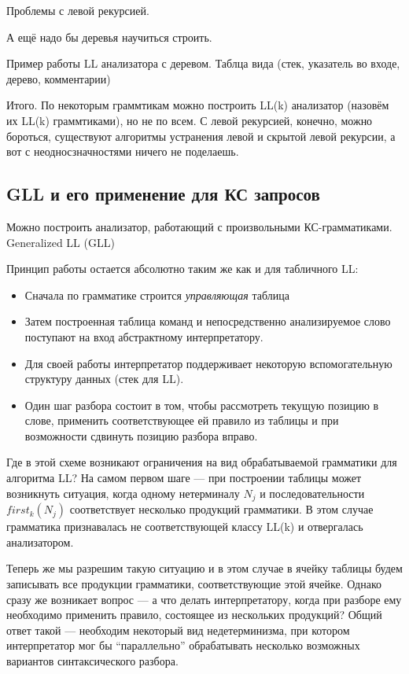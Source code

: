Проблемы с левой рекурсией.

А ещё надо бы деревья научиться строить.

\begin{example}Пример работы LL анализатора с деревом.
  Таблца вида (стек, указатель во входе, дерево, комментарии)
\end{example}

Итого. По некоторым граммтикам можно построить LL(k) анализатор (назовём их LL(k) граммтиками), но не по всем.
С левой рекурсией, конечно, можно бороться, существуют алгоритмы устранения левой и скрытой левой рекурсии, а вот с неодносзначностями ничего не поделаешь.



\subsection{GLL и его применение для КС запросов}

Можно построить анализатор, работающий с произвольными КС-грамматиками.
Generalized LL (GLL)~\cite{Scott:2010:GP:1860132.1860320,10.1007/978-3-662-46663-6_5}

Принцип работы остается абсолютно таким же как и для табличного LL: 
\begin{itemize}
  \item Сначала по грамматике строится \textit{управляющая} таблица
  \item Затем построенная таблица команд и непосредственно анализируемое слово поступают на вход абстрактному интерпретатору.
  \item Для своей работы интерпретатор поддерживает некоторую вспомогательную структуру данных (стек для LL).
  \item Один шаг разбора состоит в том, чтобы рассмотреть текущую позицию в слове, применить соответствующее ей правило из таблицы и при возможности сдвинуть позицию разбора вправо.
\end{itemize}

Где в этой схеме возникают ограничения на вид обрабатываемой грамматики для алгоритма LL? На самом первом шаге --- при построении таблицы может возникнуть ситуация, когда одному нетерминалу $N_j$ и последовательности $first_k(N_j)$ соответствует несколько продукций грамматики. В этом случае грамматика признавалась не соответствующей классу LL(k) и отвергалась анализатором.

Теперь же мы разрешим такую ситуацию и в этом случае в ячейку таблицы будем записывать все продукции грамматики, соответствующие этой ячейке. Однако сразу же возникает вопрос --- а что делать интерпретатору, когда при разборе ему необходимо применить правило, состоящее из нескольких продукций? Общий ответ такой --- необходим некоторый вид недетерминизма, при котором интерпретатор мог бы ``параллельно'' обрабатывать несколько возможных вариантов синтаксического разбора.

